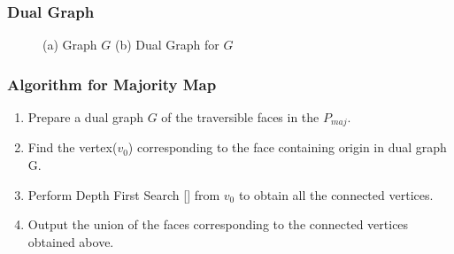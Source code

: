 \documentclass{beamer}
\begin{document}
\frame 
{
\frametitle{Dual Graph}

\begin{figure}[h]
\begin{center}
\caption{\label{fig:Dual Graph} (a) Graph $G$ (b) Dual Graph for $G$}
\end{center}
\end{figure}

}

\frame
{
\frametitle{Algorithm for Majority Map}

\begin{enumerate}
 \item Prepare a dual graph $G$ of the traversible faces in the $P_{maj}$.
 \item Find the vertex($v_0$) corresponding to the face containing origin in dual graph G.
 \item Perform Depth First Search [\cite{BOOST}] from $v_0$ to obtain all the connected vertices.
 \item Output the union of the faces corresponding to the connected vertices obtained above.  
\end{enumerate}

}
\end{document}
